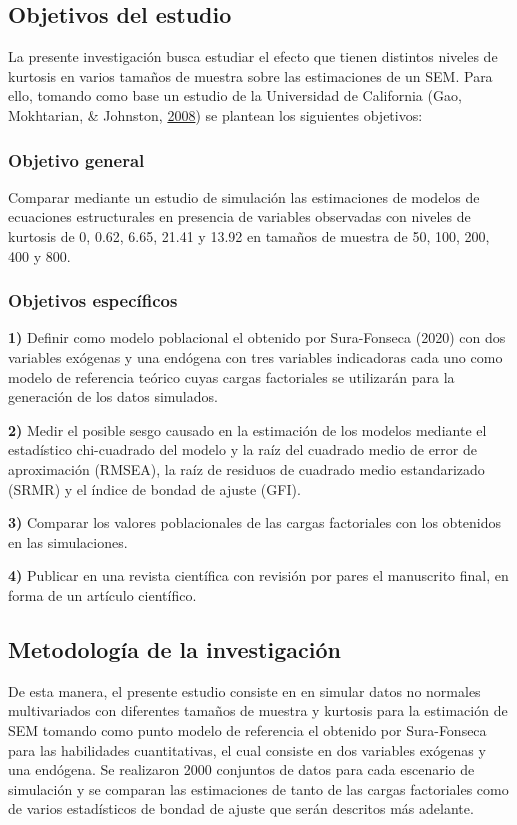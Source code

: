 \documentclass[
]{article}
\begin{document}
\subsection{Objetivos del estudio}

La presente investigación busca estudiar el efecto que tienen distintos
niveles de kurtosis en varios tamaños de muestra sobre las estimaciones
de un SEM. Para ello, tomando como base un estudio de la Universidad de
California (Gao, Mokhtarian, \& Johnston,
\protect\hyperlink{ref-gao}{2008}) se plantean los siguientes objetivos:

\subsubsection{Objetivo general}

Comparar mediante un estudio de simulación las estimaciones de modelos
de ecuaciones estructurales en presencia de variables observadas con
niveles de kurtosis de 0, 0.62, 6.65, 21.41 y 13.92 en tamaños de
muestra de 50, 100, 200, 400 y 800.

\subsubsection{Objetivos específicos}

\textbf{1)} Definir como modelo poblacional el obtenido por Sura-Fonseca
(2020) con dos variables exógenas y una endógena con tres variables
indicadoras cada uno como modelo de referencia teórico cuyas cargas
factoriales se utilizarán para la generación de los datos simulados.

\textbf{2)} Medir el posible sesgo causado en la estimación de los
modelos mediante el estadístico chi-cuadrado del modelo y la raíz del
cuadrado medio de error de aproximación (RMSEA), la raíz de residuos de
cuadrado medio estandarizado (SRMR) y el índice de bondad de ajuste
(GFI).

\textbf{3)} Comparar los valores poblacionales de las cargas factoriales
con los obtenidos en las simulaciones.

\textbf{4)} Publicar en una revista científica con revisión por pares el
manuscrito final, en forma de un artículo científico.

\subsection{Metodología de la investigación}

De esta manera, el presente estudio consiste en en simular datos no
normales multivariados con diferentes tamaños de muestra y kurtosis para
la estimación de SEM tomando como punto modelo de referencia el obtenido
por Sura-Fonseca para las habilidades cuantitativas, el cual consiste en
dos variables exógenas y una endógena. Se realizaron 2000 conjuntos de
datos para cada escenario de simulación y se comparan las estimaciones
de tanto de las cargas factoriales como de varios estadísticos de bondad
de ajuste que serán descritos más adelante.
\end{document}

